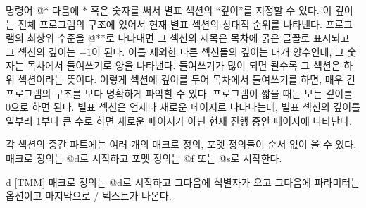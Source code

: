 \more
명령어 \.{@*} 다음에 $*$ 혹은 숫자를 써서 별표 섹션의 ``깊이''를 지정할 수 있다. 이 깊이는
전체 프로그램의 구조에 있어서 현재 별표 섹션의 상대적 순위를 나타낸다. 프로그램의 최상위 수준을
\.{@**}로 나타내면 그 섹션의 제목은 목차에 굵은 글꼴로 표시되고 그 섹션의 깊이는 $-1$이 된다.
이를 제외한 다른 섹션들의 깊이는 대개 양수인데, 그 숫자는 목차에서 들여쓰기로 양을 나타낸다.
들여쓰기가 많이 되면 될수록 그 섹션은 하위 섹션이라는 뜻이다. 이렇게 섹션에 깊이를 두어 목차에서
들여쓰기를 하면, 매우 긴 프로그램의 구조를 보다 명확하게 파악할 수 있다. 프로그램이 짧을 때는
모든 깊이를 0으로 하면 된다. 별표 섹션은 언제나 새로운 페이지로 나타나는데, 별표 섹션의 깊이를
일부러 1부다 큰 수로 하면 새로운 페이지가 아닌 현재 진행 중인 페이지에 나타난다.
 
\subsec
각 섹션의 중간 파트에는 여러 개의 매크로 정의, 포멧 정의들이 순서 없이 올 수 있다. 매크로
정의는 \.{@d}로 시작하고 포멧 정의는 \.{@f} 또는 \.{@s}로 시작한다.

\@{d} [TM\to M] 매크로 정의는 \.{@d}로 시작하고 그다음에 식별자가 오고 그다음에 파라미터는
옵션이고 마지막으로 \CEE/ 텍스트가 나온다. 

